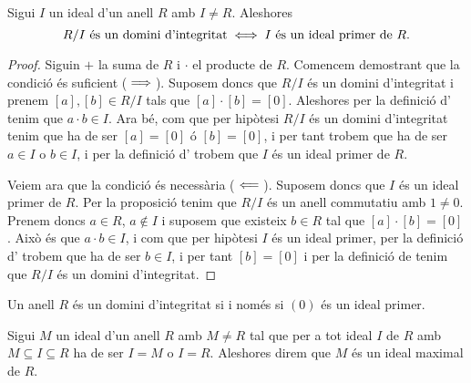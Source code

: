 \documentclass[../../Main.tex]{subfiles}
\begin{document}
	\begin{proposition}
		\label{prop:R/I domini d'integritat sii I ideal primer}
		Sigui \(I\) un ideal d'un anell \(R\) amb \(I\neq R\). Aleshores
		\[R/I\text{ és un domini d'integritat}\iff I\text{ és un ideal primer de }R.\]
		\begin{proof} %
			Siguin \(+\) la suma de \(R\) i \(\cdot\) el producte de \(R\). Comencem demostrant que la condició és suficient (\(\implies\)). Suposem doncs que \(R/I\) és un domini d'integritat i prenem \([a],[b]\in R/I\) tals que \([a]\cdot[b]=[0]\). Aleshores per la definició d' tenim que \(a\cdot b\in I\). Ara bé, com que per hipòtesi \(R/I\) és un domini d'integritat tenim que ha de ser \([a]=[0]\) ó \([b]=[0]\), i per tant trobem que ha de ser \(a\in I\) o \(b\in I\), i per la definició d' trobem que \(I\) és un ideal primer de \(R\).
			
			Veiem ara que la condició és necessària (\(\impliedby\)). Suposem doncs que \(I\) és un ideal primer de \(R\). Per la proposició  tenim que \(R/I\) és un anell commutatiu amb \(1\neq0\). Prenem doncs \(a\in R\), \(a\notin I\) i suposem que existeix \(b\in R\) tal que \([a]\cdot[b]=[0]\). Això és que \(a\cdot b\in I\), i com que per hipòtesi \(I\) és un ideal primer, per la definició d' trobem que ha de ser \(b\in I\), i per tant \([b]=[0]\) i per la definició de  tenim que \(R/I\) és un domini d'integritat.
		\end{proof}
	\end{proposition}
	\begin{corollary}
		\label{corollary:domini d'integritat sii (0) ideal primer}
		Un anell \(R\) és un domini d'integritat si i només si \((0)\) és un ideal primer.
	\end{corollary}
	\begin{definition}
		\label{def:ideal maximal}
		Sigui \(M\) un ideal d'un anell \(R\) amb \(M\neq R\) tal que  per a tot ideal \(I\) de \(R\) amb \(M\subseteq I\subseteq R\) ha de ser \(I=M\) o \(I=R\). Aleshores direm que \(M\) és un ideal maximal de \(R\).
	\end{definition}
\end{document}

